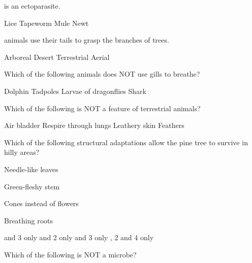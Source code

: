 \begin{questions}
    \question \fillin is an ectoparasite.

    \begin{randomizeoneparchoices}
        \CorrectChoice Lice
        \choice Tapeworm
        \choice Mule
        \choice Newt
    \end{randomizeoneparchoices}

    \question \fillin animals use their tails to grasp the branches of trees.

    \begin{randomizeoneparchoices}
        \CorrectChoice Arboreal
        \choice Desert
        \choice Terrestrial
        \choice Aerial
    \end{randomizeoneparchoices}

    \question Which of the following animals does NOT use gills to breathe?

    \begin{randomizeoneparchoices}
        \CorrectChoice Dolphin
        \choice Tadpoles
        \choice Larvae of dragonflies
        \choice Shark
    \end{randomizeoneparchoices}

    \question Which of the following is NOT a feature of terrestrial animals?

    \begin{randomizeoneparchoices}
        \CorrectChoice Air bladder
        \choice Respire through lungs
        \choice Leathery skin
        \choice Feathers
    \end{randomizeoneparchoices}

    \question Which of the following structural adaptations allow the pine tree to survive in hilly areas?

    \begin{inparaenum}
        \item Needle-like leaves
        \item Green-fleshy stem
        \item Cones instead of flowers
        \item Breathing roots
    \end{inparaenum}

    \begin{randomizeoneparchoices}
         and 3 only
         and 2 only
         and 3 only
        , 2 and 4 only
    \end{randomizeoneparchoices}

    \question Which of the following is NOT a microbe?


\end{questions}
